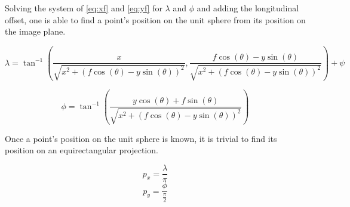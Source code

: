 \documentclass[letterpaper,10pt]{article}
\begin{document}
Solving the system of \eqref{eq:xf} and \eqref{eq:yf} for \(\lambda\) and
\(\phi\) and adding the longitudinal offset, one is able to find a point's
position on the unit sphere from its position on the image plane.\nopagebreak

\begin{equation}
\lambda = \tan ^{-1}\left(\frac{x}{\sqrt{x^2 + \left(f \cos(\theta) -
y \sin(\theta) \right)^2}},\frac{f \cos(\theta) - y \sin(\theta)}{\sqrt{x^2 +
\left(f \cos(\theta) - y \sin(\theta) \right)^2}}\right) + \psi
\end{equation}

\begin{equation}
\phi = \tan ^{-1}\left(\frac{y \cos(\theta) + f \sin(\theta)}{\sqrt{x^2 +
\left(f \cos(\theta) - y \sin(\theta) \right)^2}}\right)
\end{equation}

Once a point's position on the unit sphere is known, it is trivial to find its
position on an equirectangular projection.\nopagebreak

\begin{equation}
p_x = \frac{\lambda}{\pi}
\end{equation}
\begin{equation}
p_y = \frac{\phi}{\frac{\pi}{2}}
\end{equation}
\end{document}
